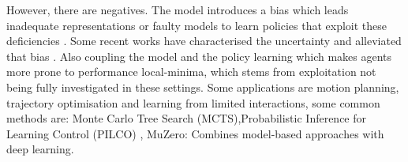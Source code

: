   However, there are negatives. The model introduces a bias which leads inadequate representations or faulty models to learn policies  that exploit these deficiencies \cite{Deisenroth2011PILCO,wang2019benchmarkingmodelbasedreinforcementlearning}. Some recent works have characterised the uncertainty and alleviated that bias \cite{kurutach2018modelensembletrustregionpolicyoptimization, chua2018deepreinforcementlearninghandful, clavera2018modelbasedreinforcementlearningmetapolicy}. Also coupling the model and the policy learning which makes agents more prone to performance local-minima, which stems from exploitation not being fully investigated in these settings. Some applications are motion planning, trajectory optimisation and learning from limited interactions, some common methods are: Monte Carlo Tree Search (MCTS),Probabilistic Inference for Learning Control (PILCO) \cite{Deisenroth2011PILCO}, MuZero: Combines model-based approaches with deep learning.

